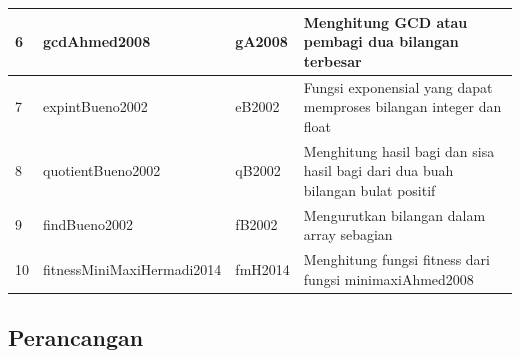 \begin{table}[h!]
\begin{center}
\begin{tabular}{|l|l|l|p{9cm}|}
 				6                                                         & gcdAhmed2008                                                                                                  & gA2008                                                     & Menghitung GCD atau pembagi dua bilangan terbesar                                                                     \\ \hline
 				7                                                         & expintBueno2002                                                                                               & eB2002                                                     & Fungsi exponensial yang dapat memproses bilangan integer dan float                                                    \\ \hline
 				8                                                         & quotientBueno2002                                                                                             & qB2002                                                     & Menghitung hasil bagi dan sisa hasil bagi dari dua buah bilangan bulat positif                                        \\ \hline
 				9                                                         & findBueno2002                                                                                                 & fB2002                                                     & Mengurutkan bilangan dalam array sebagian                                                                             \\ \hline
 				10                                                        & fitnessMiniMaxiHermadi2014                                                                                    & fmH2014                                                    & Menghitung fungsi fitness dari fungsi minimaxiAhmed2008                                                               \\ \hline
 			\end{tabular}
 		\normalsize
 	\end{center}
 \end{table}

\subsection*{Perancangan}

